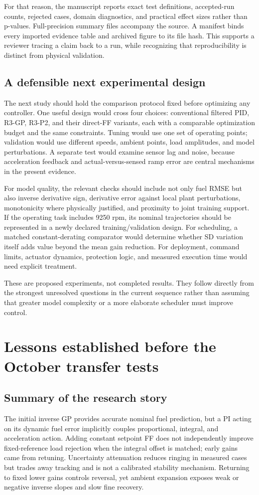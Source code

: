 For that reason, the manuscript reports exact test definitions, accepted-run counts, rejected cases, domain diagnostics, and practical effect sizes rather than p-values. Full-precision summary files accompany the source. A manifest binds every imported evidence table and archived figure to its file hash. This supports a reviewer tracing a claim back to a run, while recognizing that reproducibility is distinct from physical validation.

\section{A defensible next experimental design}
The next study should hold the comparison protocol fixed before optimizing any controller. One useful design would cross four choices: conventional filtered PID, R3-GP, R3-P2, and their direct-FF variants, each with a comparable optimization budget and the same constraints. Tuning would use one set of operating points; validation would use different speeds, ambient points, load amplitudes, and model perturbations. A separate test would examine sensor lag and noise, because acceleration feedback and actual-versus-sensed ramp error are central mechanisms in the present evidence.

For model quality, the relevant checks should include not only fuel RMSE but also inverse derivative sign, derivative error against local plant perturbations, monotonicity where physically justified, and proximity to joint training support. If the operating task includes 9250 rpm, its nominal trajectories should be represented in a newly declared training/validation design. For scheduling, a matched constant-derating comparator would determine whether SD variation itself adds value beyond the mean gain reduction. For deployment, command limits, actuator dynamics, protection logic, and measured execution time would need explicit treatment.

These are proposed experiments, not completed results. They follow directly from the strongest unresolved questions in the current sequence rather than assuming that greater model complexity or a more elaborate scheduler must improve control.


\chapter{Lessons established before the October transfer tests}
\section{Summary of the research story}
The initial inverse GP provides accurate nominal fuel prediction, but a PI acting on its dynamic fuel error implicitly couples proportional, integral, and acceleration action. Adding constant setpoint FF does not independently improve fixed-reference load rejection when the integral offset is matched; early gains came from retuning. Uncertainty attenuation reduces ringing in measured cases but trades away tracking and is not a calibrated stability mechanism. Returning to fixed lower gains controls reversal, yet ambient expansion exposes weak or negative inverse slopes and slow fine recovery.

